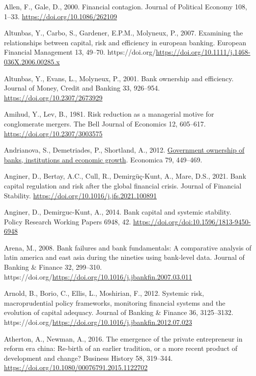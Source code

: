 \documentclass[
  12pt,
  a4paper,
]{scrreprt}
\newlength{\cslhangindent}
\newenvironment{CSLReferences}[2] %
 {\begin{list}{}{%
  \setlength{\itemindent}{0pt}
  \setlength{\leftmargin}{0pt}
  \setlength{\parsep}{0pt}
  \ifodd #1
   \setlength{\leftmargin}{\cslhangindent}
   \setlength{\itemindent}{-1\cslhangindent}
  \fi
  \setlength{\itemsep}{#2\baselineskip}}}
 {\end{list}}
\begin{document}
\begin{CSLReferences}{1}{0}
Allen, F., Gale, D., 2000. Financial contagion. Journal of Political
Economy 108, 1--33. \url{https://doi.org/10.1086/262109}

Altunbas, Y., Carbo, S., Gardener, E.P.M., Molyneux, P., 2007. Examining
the relationships between capital, risk and efficiency in european
banking. European Financial Management 13, 49--70.
https://doi.org/\url{https://doi.org/10.1111/j.1468-036X.2006.00285.x}

Altunbas, Y., Evans, L., Molyneux, P., 2001. Bank ownership and
efficiency. Journal of Money, Credit and Banking 33, 926--954.
\url{https://doi.org/10.2307/2673929}

Amihud, Y., Lev, B., 1981. Risk reduction as a managerial motive for
conglomerate mergers. The Bell Journal of Economics 12, 605--617.
\url{https://doi.org/10.2307/3003575}

Andrianova, S., Demetriades, P., Shortland, A., 2012.
\href{http://www.jstor.org/stable/23274805}{Government ownership of
banks, institutions and economic growth}. Economica 79, 449--469.

Anginer, D., Bertay, A.C., Cull, R., Demirgüç-Kunt, A., Mare, D.S.,
2021. Bank capital regulation and risk after the global financial
crisis. Journal of Financial Stability.
\url{https://doi.org/10.1016/j.jfs.2021.100891}

Anginer, D., Demirguc-Kunt, A., 2014. Bank capital and systemic
stability. Policy Research Working Papers 6948, 42.
\url{https://doi.org/doi:10.1596/1813-9450-6948}

Arena, M., 2008. Bank failures and bank fundamentals: A comparative
analysis of latin america and east asia during the nineties using
bank-level data. Journal of Banking \& Finance 32, 299--310.
https://doi.org/\url{https://doi.org/10.1016/j.jbankfin.2007.03.011}

Arnold, B., Borio, C., Ellis, L., Moshirian, F., 2012. Systemic risk,
macroprudential policy frameworks, monitoring financial systems and the
evolution of capital adequacy. Journal of Banking \& Finance 36,
3125--3132.
https://doi.org/\url{https://doi.org/10.1016/j.jbankfin.2012.07.023}

Atherton, A., Newman, A., 2016. The emergence of the private
entrepreneur in reform era china: Re-birth of an earlier tradition, or a
more recent product of development and change? Business History 58,
319--344. \url{https://doi.org/10.1080/00076791.2015.1122702}


\end{CSLReferences}
\end{document}
